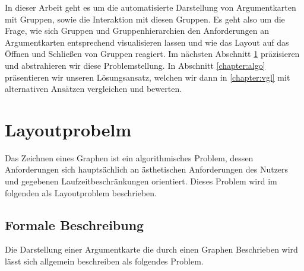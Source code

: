 In dieser Arbeit geht es um die automatisierte Darstellung von Argumentkarten mit Gruppen, sowie die Interaktion mit diesen Gruppen. 
Es geht also um die Frage, wie sich Gruppen und Gruppenhierarchien den Anforderungen an Argumentkarten entsprechend visualisieren lassen 
und wie das Layout auf das Öffnen und Schließen von Gruppen reagiert. 
Im nächsten Abschnitt \ref{chapter:layoutproblem}  präzisieren und abstrahieren wir diese Problemstellung. 
In Abschnitt \ref{chapter:algo} präsentieren wir unseren Lösungsansatz, welchen wir dann in \ref{chapter:vgl} mit alternativen Ansätzen vergleichen und bewerten.





\chapter{Layoutprobelm}
\label{chapter:layoutproblem}
Das Zeichnen eines Graphen ist ein algorithmisches Problem, dessen Anforderungen sich hauptsächlich an ästhetischen Anforderungen des Nutzers und gegebenen Laufzeitbeschränkungen orientiert. Dieses Problem wird im folgenden als Layoutproblem beschrieben.

\section{Formale Beschreibung}
Die Darstellung einer Argumentkarte die durch einen Graphen Beschrieben wird lässt sich allgemein beschreiben als folgendes Problem.

